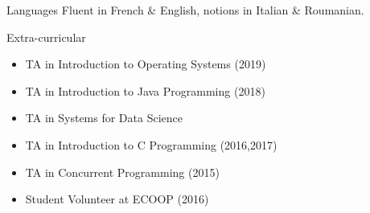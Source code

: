


\begin{cvskills}


\cvskill
{Languages} %
{Fluent in French \& English, notions in Italian \& Roumanian.} %

\cvskill
{Extra-curricular}
{
	\begin{itemize}
  \item TA in Introduction to Operating Systems (2019)
  \item TA in Introduction to Java Programming (2018)
  \item TA in Systems for Data Science
	\item TA in Introduction to C Programming (2016,2017)
	\item TA in Concurrent Programming (2015)
	\item Student Volunteer at ECOOP (2016)
	\end{itemize}
}


\end{cvskills}
